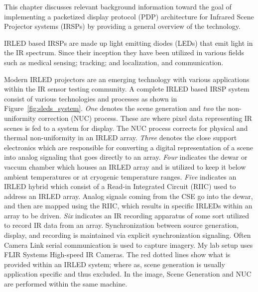 \label{chap:background}

This chapter discusses relevant background information toward the goal of implementing a packetized display protocol (PDP) architecture for Infrared Scene Projector systems (IRSPs) by providing a general overview of the technology.

IRLED based IRSPs are made up light emitting diodes (LEDs) that emit light in the IR spectrum\cite{biard1966semiconductor}. Since their inception they have been utilized in various fields such as medical sensing\cite{MonteiroEtAl2011,MEEKS1998433,Sadick2009,takhtfooladi2015effects,yamanishi1995respiration}; tracking; and localization\cite{PlotogVladescu2015,Kimon2001,SCHOLZ20151233,WalshDaemsSteckel2015,zeylikovich2003mid}, and communication\cite{CossuEtAl2014,escobosa2004ir,GeorgopoulosKormakopoulos1986,sohn2007localization,JangEtAl2012}.

Modern IRLED projectors are an emerging technology\cite{AhmedEtAl2018, NabhaEtAl2018, HernandezEtAl2018, HernandezEtAl2019_2, DeputyEtAl2019} with various applications within the IR sensor testing community. A complete IRLED based IRSP system consist of various technologies and processes as shown in Figure~\ref{fig:sleds_system}\cite{HouserEtAl2018_2}. \emph{One} denotes the scene generation and \emph{two} the non-uniformity correction (NUC) process. These are where pixel data representing IR scenes is fed to a system for display. The NUC process corrects for physical and thermal non-uniformity\cite{BarakhshanEtAl2017} in an IRLED array\cite{BarakhshanEtAl2018}. \emph{Three} denotes the close support electronics\cite{EjzakEtAl2015} which are responsible for converting a digital representation of a scene into analog signaling that goes directly to an array. \emph{Four} indicates the dewar\cite{lang1, MarksEtAl2017} or vaccum chamber which houses an IRLED array and is utilized to keep it below ambient temperatures or at cryogenic temperature ranges. \emph{Five} indicates an IRLED hybrid which consist of a Read-in Integrated Circuit (RIIC)\cite{HernandezEtAl2017} used to address an IRLED array. Analog signals coming from the CSE go into the dewar, and then are mapped using the RIIC, which results in specific IRLEDs within an array to be driven. \emph{Six} indicates an IR recording apparatus of some sort utilized to record IR data from an array. Synchronization between source generation, display, and recording is maintained via explicit synchronization signaling. Often Camera Link serial communication\cite{CameraLink2000, zhu2008design} is used to capture imagery. My lab setup uses FLIR Systems High-speed IR Cameras\cite{FLIR1, FLIR2, FLIR3}. The red dotted lines show what is provided within an IRLED system; where as, scene generation is usually application specific and thus excluded. In the image, Scene Generation and NUC are performed within the same machine.

